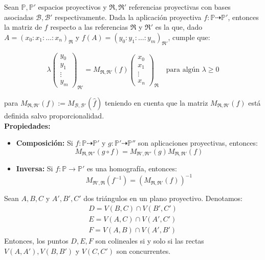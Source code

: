 Sean $\mathbb{P},\mathbb{P}'$ espacios proyectivos y $\mathfrak{R}, \mathfrak{R}'$ referencias proyectivas con bases asociadas $\mathcal{B}, \mathcal{B}'$ respectivamente. Dada la aplicación proyectiva $f:\mathbb{P} \dashrightarrow \mathbb{P}'$, entonces la matriz de $f$ respecto a las referencias $\mathfrak{R}$ y $\mathfrak{R}'$ es la que, dado $A = (x_0 : x_1 : \ldots : x_n)_\mathfrak{R}$ y $f(A) = (y_0 : y_1 : \ldots : y_m)_{\mathfrak{R}'}$, cumple que:

\[
    \lambda\begin{pmatrix}
        y_0 \\
        y_1 \\
        \vdots \\
        y_m
        \end{pmatrix}_{\mathfrak{R}'} = M_{\mathfrak{R},\mathfrak{R}'}(f) \begin{pmatrix}
        x_0 \\
        x_1 \\
        \vdots \\
        x_n
        \end{pmatrix}_{\mathfrak{R}} \quad \text{para algún } \lambda \geq 0
\]

para $M_{\mathfrak{R},\mathfrak{R}'}(f) := M_{\mathcal{B},\mathcal{B}'}(\hat{f})$ teniendo en cuenta que la matriz $M_{\mathfrak{R},\mathfrak{R}'}(f)$ está definida salvo proporcionalidad.\\

\textbf{Propiedades:}
\begin{itemize}
    \item \textbf{Composición:} Si $f:\mathbb{P} \dashrightarrow \mathbb{P}'$ y $g:\mathbb{P}' \dashrightarrow \mathbb{P}''$ son aplicaciones proyectivas, entonces:
    \[
        M_{\mathfrak{R},\mathfrak{R}''}(g \circ f) = M_{\mathfrak{R}',\mathfrak{R}''}(g) M_{\mathfrak{R},\mathfrak{R}'}(f)
    \]
    \item \textbf{Inversa:} Si $f:\mathbb{P} \to \mathbb{P}'$ es una homografía, entonces:
    \[
        M_{\mathfrak{R}',\mathfrak{R}}(f^{-1}) = (M_{\mathfrak{R},\mathfrak{R}'}(f))^{-1}
    \]
\end{itemize}


\begin{teorema} 
    Sean $A,B,C$ y $A',B',C'$ dos triángulos en un plano proyectivo. Denotamos:
    \[
        \begin{matrix}
            D = V(B,C) \cap V(B',C') \\
            E = V(A,C) \cap V(A',C') \\
            F = V(A,B) \cap V(A',B')
        \end{matrix}    
    \]
    Entonces, los puntos $D,E,F$ son colineales si y solo si las rectas $V(A,A'), V(B,B')$ y $V(C,C')$ son concurrentes.
    
\end{teorema}

